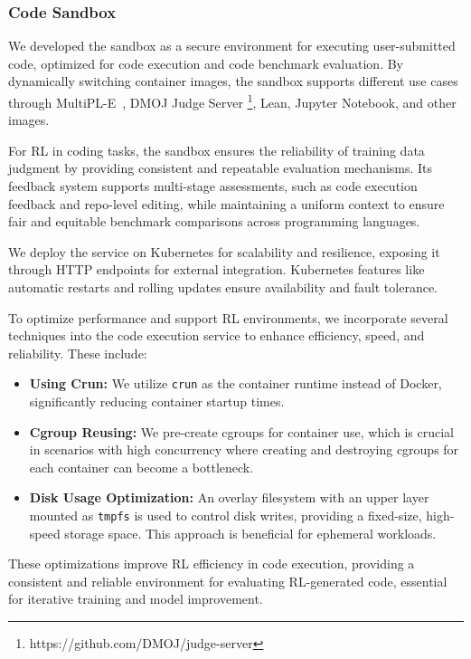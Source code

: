 \documentclass{article}
\newcommand{\citep}[1]{\parencite{#1}}
\begin{document}
\subsubsection{Code Sandbox}
\label{sec:code_box}

We developed the sandbox as a secure environment for executing user-submitted code, optimized for code execution and code benchmark evaluation. By dynamically switching container images, the sandbox supports different use cases through MultiPL-E~\citep{10103177}, DMOJ Judge Server \footnote{https://github.com/DMOJ/judge-server}, Lean, Jupyter Notebook, and other images.

For RL in coding tasks, the sandbox ensures the reliability of training data judgment by providing consistent and repeatable evaluation mechanisms. Its feedback system supports multi-stage assessments, such as code execution feedback and repo-level editing, while maintaining a uniform context to ensure fair and equitable benchmark comparisons across programming languages.

We deploy the service on Kubernetes for scalability and resilience, exposing it through HTTP endpoints for external integration. Kubernetes features like automatic restarts and rolling updates ensure availability and fault tolerance.

To optimize performance and support RL environments, we incorporate several techniques into the code execution service to enhance efficiency, speed, and reliability. These include:

\begin{itemize}
    \item \textbf{Using Crun:} We utilize \texttt{crun} as the container runtime instead of Docker, significantly reducing container startup times.
    \item \textbf{Cgroup Reusing:} We pre-create cgroups for container use, which is crucial in scenarios with high concurrency where creating and destroying cgroups for each container can become a bottleneck.
    \item \textbf{Disk Usage Optimization:} An overlay filesystem with an upper layer mounted as \texttt{tmpfs} is used to control disk writes, providing a fixed-size, high-speed storage space. This approach is beneficial for ephemeral workloads.
\end{itemize}



These optimizations improve RL efficiency in code execution, providing a consistent and reliable environment for evaluating RL-generated code, essential for iterative training and model improvement.
\end{document}
